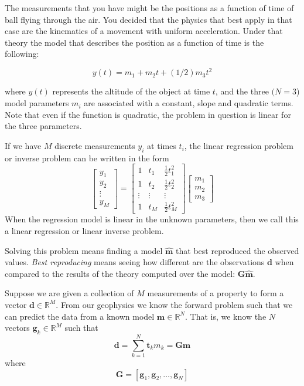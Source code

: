 \documentclass{article}
\newcommand{\real}{\mathbb{R}}
\begin{document}
The measurements that you have might be the positions as a function of time of ball flying through the air. You decided that the physics that best apply in that case are the kinematics of a movement with uniform acceleration. Under that theory the model that describes the position as a function of time is the following:

\begin{equation}
y(t) = m_1 + m_2 t + (1/2) m_3 t^2
\end{equation}

where $y(t)$ represents the altitude of the object at time $t$, and the three $(N=3$) model parameters $m_i$ are associated with a constant, slope and quadratic terms. Note that even if the function is quadratic, the problem in question is linear for the three parameters. 

If we have $M$ discrete measurements $y_i$ at times $t_i$, the linear regression problem or inverse problem can be written in the form
\begin{equation}
\left[
\begin{array}{c}
  y_1   \\
  y_2   \\
  \vdots \\
  y_M
\end{array}
\right] = 
\left[
\begin{array}{ccc}
  1 & t_1 & {\scriptstyle{\frac{1}{2}}}t_1^2 \\
  1  &t_2 &  {\scriptstyle{\frac{1}{2}}}t_2^2\\
  \vdots & \vdots  & \vdots\\
  1 & t_M &  {\scriptstyle{\frac{1}{2}}}t_M^2
\end{array}
\right]
\left[
\begin{array}{c}
  m_1   \\
  m_2    \\
  m_3
\end{array}
\right] 
\end{equation}
When the regression model is linear in the unknown parameters, then we call this a linear regression or linear inverse problem. 

Solving this problem means finding a model $\mathbf{\hat{m}}$ that best reproduced the observed values. \emph{Best reproducing} means seeing how different are the observations $\mathbf{d}$ when compared to the results of the theory computed over the model: $\mathbf{G} \mathbf{\hat{m}}$.

Suppose we are given a collection of $M$ measurements of a property to form a vector $\mathbf{d} \in \real^M$. From our geophysics we know the forward problem such that we can predict the data from a known model $\mathbf{m} \in \real^N$. That is, we know the $N$ vectors $\mathbf{g}_k \in \real^M$ such that 
\begin{equation}
\mathbf{d} = \sum_{k=1}^{N} \mathbf{t}_k m_k = \mathbf{G} \mathbf{m}
\end{equation}
where
\begin{equation}
\mathbf{G} = \left[ \mathbf{g}_1, \mathbf{g}_2, \dots, \mathbf{g}_N \right] 
\end{equation}
\end{document}
